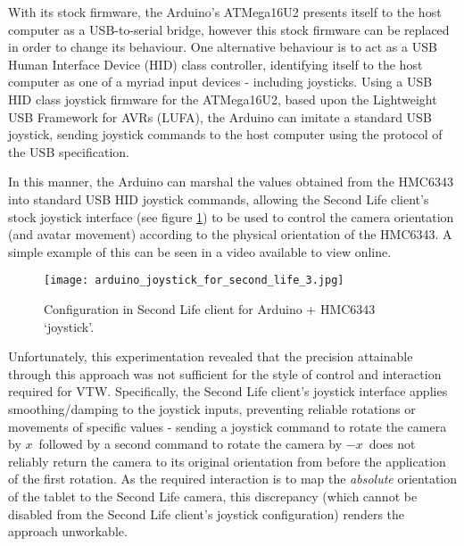 With its stock firmware, the Arduino's ATMega16U2 presents itself to the host computer as a USB-to-serial bridge, however this stock firmware can be replaced in order to change its behaviour. One alternative behaviour is to act as a USB Human Interface Device (HID) class controller, identifying itself to the host computer as one of a myriad input devices - including joysticks. Using a USB HID class joystick firmware for the ATMega16U2\arduinousbhidFootnote{}, based upon the Lightweight USB Framework for AVRs (LUFA)\lufaFootnote{}, the Arduino can imitate a standard USB joystick, sending joystick commands to the host computer using the protocol of the USB specification.


In this manner, the Arduino can marshal the values obtained from the HMC6343 into standard USB HID joystick commands, allowing the Second Life client's stock joystick interface (see figure \ref{arduino_joystick_for_second_life_3.jpg}) to be used to control the camera orientation (and avatar movement) according to the physical orientation of the HMC6343. A simple example of this can be seen in a video available to view online\ArduinoJoystickVideoFootnote{}.

\begin{figure}[h]
\centering
  \texttt{[image: arduino\_joystick\_for\_second\_life\_3.jpg]}
  \caption{Configuration in Second Life client for Arduino + HMC6343 `joystick'.}
  \label{arduino_joystick_for_second_life_3.jpg}
\end{figure}

Unfortunately, this experimentation revealed that the precision attainable through this approach was not sufficient for the style of control and interaction required for VTW. Specifically, the Second Life client's joystick interface applies smoothing/damping to the joystick inputs, preventing reliable rotations or movements of specific values - sending a joystick command to rotate the camera by $x$\textdegree\ followed by a second command to rotate the camera by $-x$\textdegree\ does not reliably return the camera to its original orientation from before the application of the first rotation. As the required interaction is to map the \textit{absolute} orientation of the tablet to the Second Life camera, this discrepancy (which cannot be disabled from the Second Life client's joystick configuration) renders the approach unworkable.


